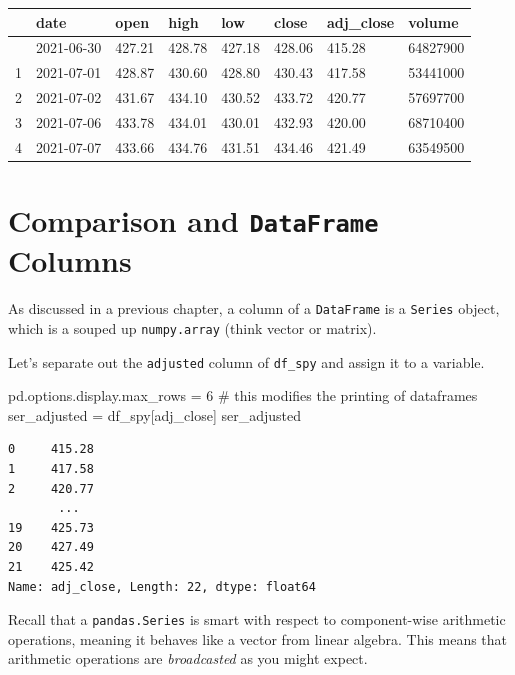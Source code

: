 \documentclass[
  letterpaper,
  DIV=11,
  numbers=noendperiod]{scrreprt}
\newenvironment{Shaded}{\begin{snugshade}}{\end{snugshade}}
\newcommand{\CommentTok}[1]{\textcolor[rgb]{0.37,0.37,0.37}{#1}}
\newcommand{\DecValTok}[1]{\textcolor[rgb]{0.68,0.00,0.00}{#1}}
\newcommand{\NormalTok}[1]{\textcolor[rgb]{0.00,0.23,0.31}{#1}}
\newcommand{\OperatorTok}[1]{\textcolor[rgb]{0.37,0.37,0.37}{#1}}
\newcommand{\StringTok}[1]{\textcolor[rgb]{0.13,0.47,0.30}{#1}}
\begin{document}
\begin{longtable}[]{@{}llllllll@{}}
\toprule\noalign{}
& date & open & high & low & close & adj\_close & volume \\
\midrule\noalign{}
\endhead
\bottomrule\noalign{}
\endlastfoot
0 & 2021-06-30 & 427.21 & 428.78 & 427.18 & 428.06 & 415.28 &
64827900 \\
1 & 2021-07-01 & 428.87 & 430.60 & 428.80 & 430.43 & 417.58 &
53441000 \\
2 & 2021-07-02 & 431.67 & 434.10 & 430.52 & 433.72 & 420.77 &
57697700 \\
3 & 2021-07-06 & 433.78 & 434.01 & 430.01 & 432.93 & 420.00 &
68710400 \\
4 & 2021-07-07 & 433.66 & 434.76 & 431.51 & 434.46 & 421.49 &
63549500 \\
\end{longtable}

\hypertarget{comparison-and-dataframe-columns}{%
\section{\texorpdfstring{Comparison and \texttt{DataFrame}
Columns}{Comparison and DataFrame Columns}}\label{comparison-and-dataframe-columns}}

As discussed in a previous chapter, a column of a \texttt{DataFrame} is
a \texttt{Series} object, which is a souped up \texttt{numpy.array}
(think vector or matrix).

Let's separate out the \texttt{adjusted} column of \texttt{df\_spy} and
assign it to a variable.

\begin{Shaded}
\begin{Highlighting}[]
\NormalTok{pd.options.display.max\_rows }\OperatorTok{=} \DecValTok{6} \CommentTok{\# this modifies the printing of dataframes}
\NormalTok{ser\_adjusted }\OperatorTok{=}\NormalTok{ df\_spy[}\StringTok{\textquotesingle{}adj\_close\textquotesingle{}}\NormalTok{]}
\NormalTok{ser\_adjusted}
\end{Highlighting}
\end{Shaded}

\begin{verbatim}
0     415.28
1     417.58
2     420.77
       ...  
19    425.73
20    427.49
21    425.42
Name: adj_close, Length: 22, dtype: float64
\end{verbatim}

Recall that a \texttt{pandas.Series} is smart with respect to
component-wise arithmetic operations, meaning it behaves like a vector
from linear algebra. This means that arithmetic operations are
\emph{broadcasted} as you might expect.
\end{document}
